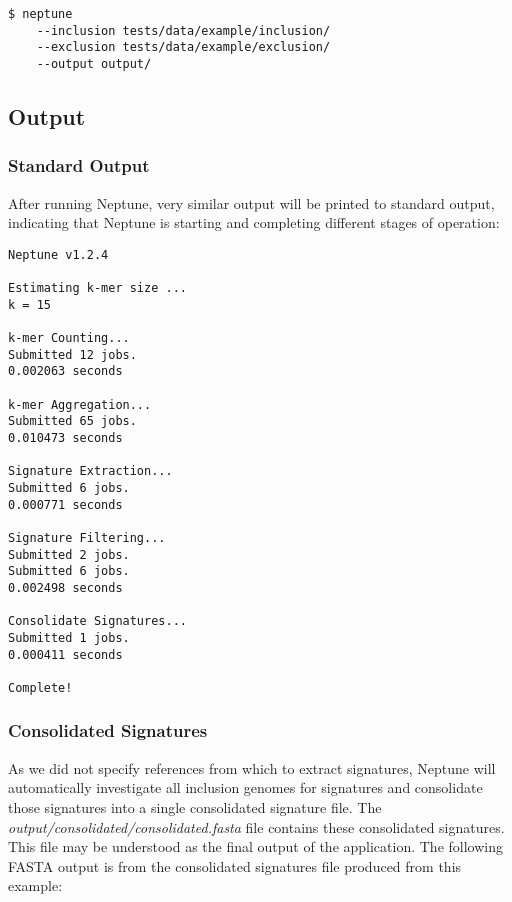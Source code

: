 \documentclass[a4paper,10pt]{article}
\begin{document}
\begin{minipage}{\linewidth}
\begin{lstlisting}[frame=single, style=bash]
$ neptune
    --inclusion tests/data/example/inclusion/
    --exclusion tests/data/example/exclusion/
    --output output/
\end{lstlisting}
\end{minipage}

\subsection{Output}

\subsubsection{Standard Output}

After running Neptune, very similar output will be printed to standard output, indicating that Neptune is starting and completing different stages of operation:

\begin{minipage}{\linewidth}
\begin{lstlisting}[frame=single, style=bash]
Neptune v1.2.4

Estimating k-mer size ...
k = 15

k-mer Counting...
Submitted 12 jobs.
0.002063 seconds

k-mer Aggregation...
Submitted 65 jobs.
0.010473 seconds

Signature Extraction...
Submitted 6 jobs.
0.000771 seconds

Signature Filtering...
Submitted 2 jobs.
Submitted 6 jobs.
0.002498 seconds

Consolidate Signatures...
Submitted 1 jobs.
0.000411 seconds

Complete!
\end{lstlisting}
\end{minipage}

\subsubsection{Consolidated Signatures}

As we did not specify references from which to extract signatures, Neptune will automatically investigate all inclusion genomes for signatures and consolidate those signatures into a single consolidated signature file. The \textit{output/consolidated/consolidated.fasta} file contains these consolidated signatures. This file may be understood as the final output of the application. The following FASTA output is from the consolidated signatures file produced from this example:
\end{document}
